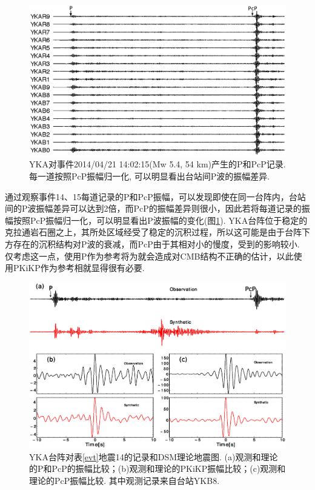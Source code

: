 \begin{figure}
\centering
\includegraphics[width=0.87\linewidth]{fig/chap3/p_pcp_4599655.eps}
\caption{YKA对事件2014/04/21 14:02:15(Mw 
5.4, 54 km)产生的P和PcP记录. 每一道按照PcP振幅归一化, 可以明显看出台站间P波的振幅差异. }
\label{p_pcp}
\end{figure}

通过观察事件14、15每道记录的P和PcP振幅，可以发现即使在同一台阵内，台站间的P波振幅差异可以达到2倍，而PcP的振幅差异则很小，因此若将每道记录的振幅按照PcP振幅归一化，可以明显看出P波振幅的变化(图\ref{p_pcp}). YKA台阵位于稳定的克拉通岩石圈之上，其所处区域经受了稳定的沉积过程，所以这可能是由于台阵下方存在的沉积结构对P波的衰减，而PcP由于其相对小的慢度，受到的影响较小. 仅考虑这一点，使用P作为参考将为就会造成对CMB结构不正确的估计，以此使用PKiKP作为参考相就显得很有必要. 

\begin{figure}
\centering
\includegraphics[width=0.85\linewidth]{fig/chap3/syn_2}
\caption{YKA台阵对表\ref{evt}地震14的记录和DSM理论地震图. (a)观测和理论的P和PcP的振幅比较；(b)观测和理论的PKiKP振幅比较；(c)观测和理论的PcP振幅比较. 其中观测记录来自台站YKB8. }
\label{fig:syn_2}
\end{figure}

